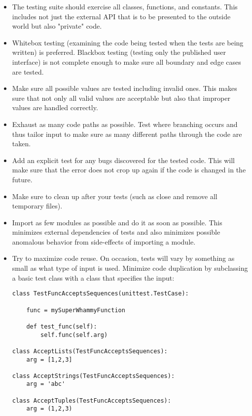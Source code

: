 \begin{itemize}
\item The testing suite should exercise all classes, functions, and
      constants.
      This includes not just the external API that is to be presented to the
      outside world but also "private" code.
\item Whitebox testing (examining the code being tested when the tests are
      being written) is preferred.
      Blackbox testing (testing only the published user interface) is not
      complete enough to make sure all boundary and edge cases are tested.
\item Make sure all possible values are tested including invalid ones.
      This makes sure that not only all valid values are acceptable but also
      that improper values are handled correctly.
\item Exhaust as many code paths as possible.
      Test where branching occurs and thus tailor input to make sure as many
      different paths through the code are taken.
\item Add an explicit test for any bugs discovered for the tested code.
      This will make sure that the error does not crop up again if the code is
      changed in the future.
\item Make sure to clean up after your tests (such as close and remove all
      temporary files).
\item Import as few modules as possible and do it as soon as possible.
      This minimizes external dependencies of tests and also minimizes possible
      anomalous behavior from side-effects of importing a module.
\item Try to maximize code reuse.
      On occasion, tests will vary by something as small as what type
      of input is used.
      Minimize code duplication by subclassing a basic test class with a class
      that specifies the input:
\begin{verbatim}
class TestFuncAcceptsSequences(unittest.TestCase):

    func = mySuperWhammyFunction

    def test_func(self):
        self.func(self.arg)

class AcceptLists(TestFuncAcceptsSequences):
    arg = [1,2,3]

class AcceptStrings(TestFuncAcceptsSequences):
    arg = 'abc'

class AcceptTuples(TestFuncAcceptsSequences):
    arg = (1,2,3)
\end{verbatim}
\end{itemize}

